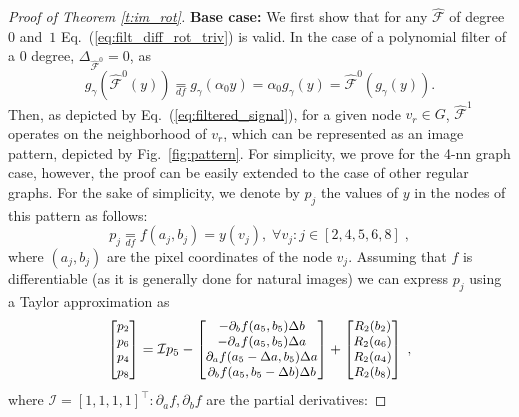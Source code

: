\documentclass[10pt,journal,compsoc]{IEEEtran}
\newcommand{\df}{\mathop{=}\limits_{df}}
\newcommand{\hmF}{\hat{\mathcal{F}}}
\begin{document}
\begin{proof}[Proof of Theorem \ref{t:im_rot}]
		\textbf{Base case:} We first show that for any $\hmF$ of degree $0$ and~$1$ Eq.~(\ref{eq:filt_diff_rot_triv}) is valid. In the case of a polynomial filter of a $0$ degree, $\Delta_{\hmF^0}  = 0$, as
		\begin{equation}
		g_\gamma\left(\hmF^0 (y)\right) \df g_\gamma(\alpha_0 y) = \alpha_0 g_\gamma(y) = \hmF^0 (g_\gamma(y)).
		\label{eq:filt_diff_rot_zero_deg}
		\end{equation}
		\noindent
		Then, as depicted by Eq.~(\ref{eq:filtered_signal}), for a given node $v_r \in G$, $\hmF^1$ operates on the neighborhood of $v_r$, which can be represented as an image pattern, depicted by Fig.~\ref{fig:pattern}. For simplicity, we prove for the 4-nn graph case, however, the proof can be easily extended to the case of other regular graphs.
		For the sake of simplicity, we denote by $p_j$ the values of $y$ in the nodes of this pattern as follows:
		\begin{equation}
		p_j \df f(a_j,b_j) = y(v_j), \; \forall v_j: j \in [2,4,5,6,8] \;,
		\end{equation}
		\noindent
		where $(a_j, b_j)$ are the pixel coordinates of the node $v_j$. Assuming that $f$ is differentiable (as it is generally done for natural images) we can express $p_j$ using a Taylor approximation as
		\begin{equation}
		\small
		\begin{bmatrix}
		p_2 \\ p_6 \\ p_4 \\ p_8 \\
		\end{bmatrix} =
		\mathcal{I} p_5 -
		\begin{bmatrix}
		- \partial_b f(a_5, b_5) \Delta b \\
		- \partial_a f(a_5, b_5) \Delta a \\
		\partial_a f(a_5 - \Delta a, b_5) \Delta a\\
		\partial_b f(a_5, b_5- \Delta b)  \Delta b\\
		\end{bmatrix} +
		\begin{bmatrix}
		R_2(b_2) \\ R_2(a_6) \\ R_2(a_4) \\ R_2(b_8) \\
		\end{bmatrix} \;,
		\label{eq:points_o}
		\end{equation}
		\noindent
		where $\mathcal{I} = [1,1,1,1]^\intercal: \partial_a f, \partial_b f$ are the partial derivatives:

\end{proof}
\end{document}
